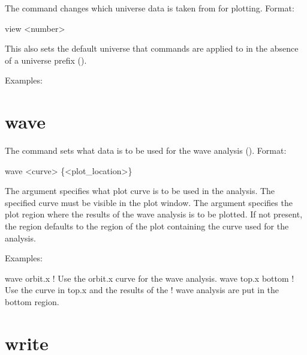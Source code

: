 {{{The  command changes which universe data is taken from for
plotting. Format:
\begin{example}
  view <number>
\end{example}

\vskip 0.1in 

This also sets the default universe that commands are applied to in
the absence of a universe prefix ().

Examples:

\section{wave}
\label{s:wave}

The  command sets what data is to be used for the wave
analysis (). Format:
\begin{example}
  wave <curve> \{<plot_location>\}
\end{example}
\vskip 0.1in

The  argument specifies what plot curve is to be used in
the analysis. The specified curve must be visible in the plot window.
The  argument specifies the plot region where the
results of the wave analysis is to be plotted. If not present, the
region defaults to the region of the plot containing the curve used
for the analysis.

Examples:
\begin{example}
  wave orbit.x      ! Use the orbit.x curve for the wave analysis.
  wave top.x bottom ! Use the curve in top.x and the results of the 
                    !  wave analysis are put in the bottom region.
\end{example}

\section{write}
\label{s:write}

}}}
